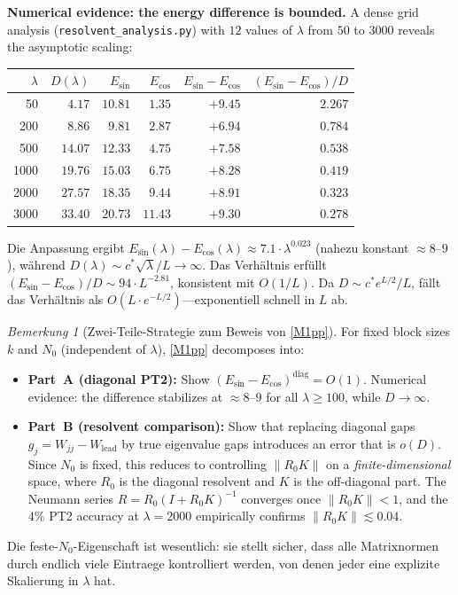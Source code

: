 \documentclass[12pt,a4paper]{article}
\theoremstyle{definition}
\theoremstyle{remark}
\newtheorem{remark}[theorem]{Bemerkung}
\begin{document}
\noindent\textbf{Numerical evidence: the energy difference is bounded.} A dense grid analysis (\texttt{resolvent\_analysis.py}) with $12$ values of $\lambda$ from $50$ to $3000$ reveals the asymptotic scaling:

\begin{center}
\small
\renewcommand{\arraystretch}{1.15}
\begin{tabular}{r|r|r|r|r|r}
$\lambda$ & $D(\lambda)$ & $E_{\sin}$ & $E_{\cos}$ & $E_{\sin}\!-\!E_{\cos}$ & $(E_{\sin}\!-\!E_{\cos})/D$ \\\hline
50   & $4.17$  & $10.81$ & $1.35$ & $+9.45$ & $2.267$ \\
200  & $8.86$  & $9.81$  & $2.87$ & $+6.94$ & $0.784$ \\
500  & $14.07$ & $12.33$ & $4.75$ & $+7.58$ & $0.538$ \\
1000 & $19.76$ & $15.03$ & $6.75$ & $+8.28$ & $0.419$ \\
2000 & $27.57$ & $18.35$ & $9.44$ & $+8.91$ & $0.323$ \\
3000 & $33.40$ & $20.73$ & $11.43$ & $+9.30$ & $0.278$
\end{tabular}
\end{center}

\noindent Die Anpassung ergibt $E_{\sin}(\lambda) - E_{\cos}(\lambda) \approx 7.1\cdot\lambda^{0.023}$ (nahezu konstant $\approx 8$--$9$), während $D(\lambda) \sim c^*\sqrt{\lambda}/L \to \infty$. Das Verhältnis erfüllt $(E_{\sin} - E_{\cos})/D \sim 94\cdot L^{-2.81}$, konsistent mit $O(1/L)$. Da $D \sim c^* e^{L/2}/L$, fällt das Verhältnis als $O(L\cdot e^{-L/2})$---exponentiell schnell in $L$ ab.

\begin{remark}[Zwei-Teile-Strategie zum Beweis von \ref{M1pp}]
\label{rem:two-parts}
For fixed block sizes $k$ and $N_0$ (independent of $\lambda$), \ref{M1pp} decomposes into:
\begin{itemize}
  \item \textbf{Part~A (diagonal PT2):} Show $(E_{\sin} - E_{\cos})^{\mathrm{diag}} = O(1)$. Numerical evidence: the difference stabilizes at $\approx 8$--$9$ for all $\lambda \geq 100$, while $D \to \infty$.
  \item \textbf{Part~B (resolvent comparison):} Show that replacing diagonal gaps $g_j = W_{jj} - W_{\mathrm{lead}}$ by true eigenvalue gaps introduces an error that is $o(D)$. Since $N_0$ is fixed, this reduces to controlling $\|R_0 K\|$ on a \emph{finite-dimensional} space, where $R_0$ is the diagonal resolvent and $K$ is the off-diagonal part. The Neumann series $R = R_0(I + R_0 K)^{-1}$ converges once $\|R_0 K\| < 1$, and the $4\%$ PT2 accuracy at $\lambda = 2000$ empirically confirms $\|R_0 K\| \lesssim 0.04$.
\end{itemize}
Die feste-$N_0$-Eigenschaft ist wesentlich: sie stellt sicher, dass alle Matrixnormen durch endlich viele Eintraege kontrolliert werden, von denen jeder eine explizite Skalierung in $\lambda$ hat.
\end{remark}
\end{document}

